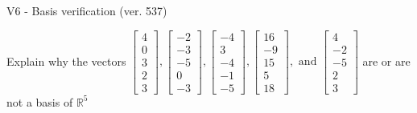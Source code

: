 \begin{exercise}
  \begin{exerciseTitle}V6 - Basis verification (ver. 537)\end{exerciseTitle}
  \begin{exerciseStatement}
    Explain why the vectors \(\left[\begin{array}{r}
4 \\
0 \\
3 \\
2 \\
3
\end{array}\right] , \left[\begin{array}{r}
-2 \\
-3 \\
-5 \\
0 \\
-3
\end{array}\right] , \left[\begin{array}{r}
-4 \\
3 \\
-4 \\
-1 \\
-5
\end{array}\right] , \left[\begin{array}{r}
16 \\
-9 \\
15 \\
5 \\
18
\end{array}\right] , \text{ and } \left[\begin{array}{r}
4 \\
-2 \\
-5 \\
2 \\
3
\end{array}\right]\) are or are not a basis of \(\mathbb{R}^5\)	



\end{exerciseStatement}
\end{exercise}

